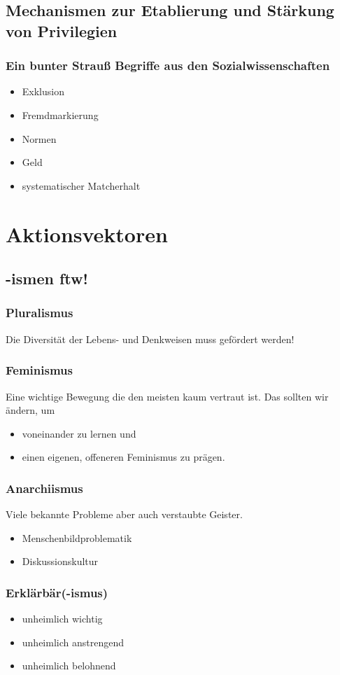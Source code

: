 \documentclass{beamer}
\begin{document}
\subsection{Mechanismen zur Etablierung und Stärkung von Privilegien}
\frame
{
  \frametitle{Ein bunter Strauß Begriffe aus den Sozialwissenschaften}
  
  \begin{itemize}[<+->]
  \item Exklusion
  \item Fremdmarkierung
  \item Normen
  \item Geld
  \item systematischer Matcherhalt
  \end{itemize}
}
\section{Aktionsvektoren}
\subsection{-ismen ftw!}
\frame
{
  \frametitle{Pluralismus}
  
  Die Diversität der Lebens- und Denkweisen muss gefördert werden!
}
\frame
{
  \frametitle{Feminismus}
  
  Eine wichtige Bewegung die den meisten kaum vertraut ist. Das sollten wir ändern, um
  \begin{itemize}[<+->]
  \item voneinander zu lernen und
  \item einen eigenen, offeneren Feminismus zu prägen.
  \end{itemize}

}
\frame
{
  \frametitle{Anarchiismus}
  
  Viele bekannte Probleme aber auch verstaubte Geister.
  \begin{itemize}[<+->]
  \item Menschenbildproblematik
  \item Diskussionskultur
  \end{itemize}

}
\frame
{
  \frametitle{Erklärbär(-ismus)}
  
  \begin{itemize}[<+->]
  \item unheimlich wichtig
  \item unheimlich anstrengend
  \item unheimlich belohnend
  \end{itemize}

}
\end{document}
